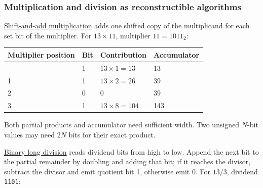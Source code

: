 \subsubsection{Multiplication and division as reconstructible algorithms}\label{01-foundations-i-ch001-multiplication-and-division-as-reconstructible-algorithms}

\hypertarget{01-foundations-i-ch001-multiplication-and-division-as-reconstructible-algorithms}{}

\hyperref[appendix-a65290d66ed9]{Shift-and-add multiplication} adds one shifted copy of the multiplicand for each set bit of the multiplier. For \(13\times11\), multiplier \(11=1011_2\):

{\def\LTcaptype{none} %
\begin{longtable}[]{@{}llll@{}}
\toprule\noalign{}
Multiplier position & Bit & Contribution & Accumulator \\
\midrule\noalign{}
\endhead
\bottomrule\noalign{}
\endlastfoot
0 & 1 & \(13\times1=13\) & 13 \\
1 & 1 & \(13\times2=26\) & 39 \\
2 & 0 & 0 & 39 \\
3 & 1 & \(13\times8=104\) & 143 \\
\end{longtable}
}

Both partial products and accumulator need sufficient width. Two unsigned \(N\)-bit values may need \(2N\) bits for their exact product.

\hyperref[appendix-89985e6a2685]{Binary long division} reads dividend bits from high to low. Append the next bit to the partial remainder by doubling and adding that bit; if it reaches the divisor, subtract the divisor and emit quotient bit 1, otherwise emit 0. For \(13/3\), dividend \texttt{1101}:

